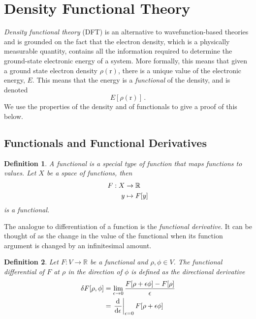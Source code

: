 \documentclass{article}
\theoremstyle{plain}\theoremheaderfont{\normalfont\itshape}\theorembodyfont{\rmfamily}\theoremseparator{.}\newtheorem*{rem}{Remark}\newtheorem*{ex}{Example}\newtheorem*{proof}{Proof}\newtheorem*{altp}{Alternative proof}
\theoremstyle{plain}\theoremheaderfont{\normalfont\bfseries}\theorembodyfont{\rmfamily}\theoremseparator{.}\newtheorem{thm}{Theorem}[section]\newtheorem{lem}[thm]{Lemma}\newtheorem{prop}[thm]{Proposition}\newtheorem*{cor}{Corollary}\newtheorem{defn}[thm]{Definition}\newtheorem{clm}[thm]{Claim}\newtheorem{clminproof}{Claim}
\theoremstyle{break}\theoremheaderfont{\normalfont\itshape}\theorembodyfont{\rmfamily}\theoremseparator{.\medskip}\newtheorem*{proofskip}{Proof}\newtheorem*{exs}{Examples}\newtheorem*{rems}{Remarks}
\theoremstyle{break}\theoremheaderfont{\normalfont\bfseries}\theorembodyfont{\rmfamily}\theoremseparator{.\medskip}\newtheorem{lemskip}[thm]{Lemma}\newtheorem{defnskip}[thm]{Definition}\newtheorem{propskip}[thm]{Proposition}\newtheorem{thmskip}[thm]{Theorem}
\numberwithin{equation}{section}
\newcommand{\dv}[3][]{\frac{\mathrm{d}^{#1} #2}{{\mathrm{d} #3}^{#1}}}
\newcommand{\vb}[1]{\bm{\mathrm{#1}}}
\begin{document}
    \newpage
    \section{Density Functional Theory}
    \textit{Density functional theory} (DFT) is an alternative to wavefunction-based theories and is grounded on the fact that the electron density, which is a physically measurable quantity, contains all the information required to determine the ground-state electronic energy of a system. More formally, this means that given a ground state electron density \(\rho(\vb{r})\), there is a unique value of the electronic energy, \(E\). This means that the energy is a \textit{functional} of the density, and is denoted
    \begin{equation}
        E[\rho(\vb{r})]\,.
    \end{equation}
    We use the properties of the density and of functionals to give a proof of this below.
    \subsection{Functionals and Functional Derivatives}
    \begin{defn}
        A \textit{functional} is a special type of function that maps functions to values. Let \(X\) be a space of functions, then
        \begin{align}
            F:X&\to\mathbb{R}\notag\\
            y&\mapsto F[y]
        \end{align}
        is a functional.
    \end{defn}

    The analogue to differentiation of a function is the \textit{functional derivative}. It can be thought of as the change in the value of the functional when its function argument is changed by an infinitesimal amount.

    \begin{defn}
        Let \(F:V\to\mathbb{R}\) be a functional and \(\rho,\phi\in V\). The \textit{functional differential} of \(F\) at \(\rho\) in the direction of \(\phi\) is defined as the directional derivative
        \begin{align}
            \delta F[\rho,\phi]&=\lim_{\epsilon\to 0}\frac{F[\rho+\epsilon\phi]-F[\rho]}{\epsilon}\notag\\
            &=\left.\dv{}{\epsilon}\right|_{\epsilon=0} F[\rho+\epsilon\phi]
        \end{align}
    \end{defn}
\end{document}
